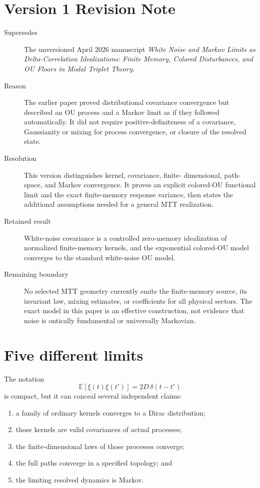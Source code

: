 \documentclass[11pt]{article}
\newcommand{\E}{\mathbb{E}}
\begin{document}
\section*{Version 1 Revision Note}
\begin{description}
\item[Supersedes] The unversioned April 2026 manuscript
\emph{White Noise and Markov Limits as Delta-Correlation Idealizations:
Finite Memory, Colored Disturbances, and OU Floors in Modal Triplet Theory}.
\item[Reason] The earlier paper proved distributional covariance convergence
but described an OU process and a Markov limit as if they followed
automatically. It did not require positive-definiteness of a covariance,
Gaussianity or mixing for process convergence, or closure of the resolved
state.
\item[Resolution] This version distinguishes kernel, covariance, finite-
dimensional, path-space, and Markov convergence. It proves an explicit
colored-OU functional limit and the exact finite-memory response variance,
then states the additional assumptions needed for a general MTT realization.
\item[Retained result] White-noise covariance is a controlled zero-memory
idealization of normalized finite-memory kernels, and the exponential
colored-OU model converges to the standard white-noise OU model.
\item[Remaining boundary] No selected MTT geometry currently emits the
finite-memory source, its invariant law, mixing estimates, or coefficients for
all physical sectors. The exact model in this paper is an effective
construction, not evidence that noise is ontically fundamental or universally
Markovian.
\end{description}

\tableofcontents

\section{Five different limits}

The notation
\[
\E[\xi(t)\xi(t')]=2D\,\delta(t-t')
\]
is compact, but it can conceal several independent claims:
\begin{enumerate}
\item a family of ordinary kernels converges to a Dirac distribution;
\item those kernels are valid covariances of actual processes;
\item the finite-dimensional laws of those processes converge;
\item the full paths converge in a specified topology; and
\item the limiting resolved dynamics is Markov.
\end{enumerate}
\end{document}

